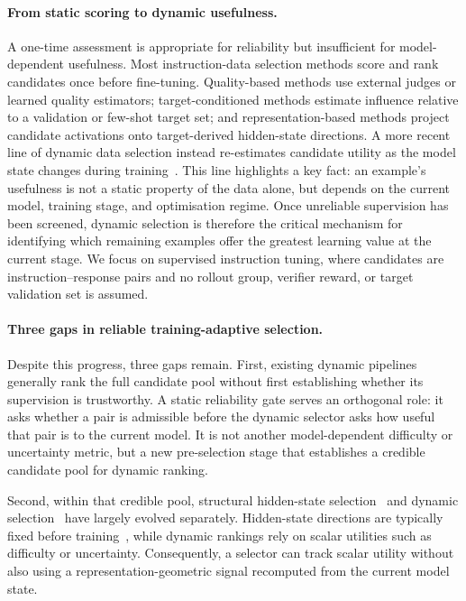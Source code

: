\paragraph{From static scoring to dynamic usefulness.}
A one-time assessment is appropriate for reliability but insufficient
for model-dependent usefulness. Most instruction-data selection
methods score and rank candidates once before fine-tuning.
Quality-based methods use external judges or learned quality
estimators; target-conditioned methods estimate influence relative
to a validation or few-shot target set; and representation-based
methods project candidate activations onto target-derived hidden-state
directions. A more recent line of dynamic data selection instead
re-estimates candidate utility as the model state changes during
training~\cite{kung2023activeit, sun2025dots}. This line highlights a
key fact: an example's usefulness is not a static property of the
data alone, but depends on the current model, training stage, and
optimisation regime. Once unreliable supervision has been screened,
dynamic selection is therefore the critical mechanism for identifying
which remaining examples offer the greatest learning value at the
current stage. We focus on supervised instruction tuning, where
candidates are instruction--response pairs and no rollout group,
verifier reward, or target validation set is assumed.

\paragraph{Three gaps in reliable training-adaptive selection.}
Despite this progress, three gaps remain. First, existing dynamic
pipelines generally rank the full candidate pool without first
establishing whether its supervision is trustworthy. A static
reliability gate serves an orthogonal role: it asks whether a pair is
admissible before the dynamic selector asks how useful that pair is
to the current model. It is not another model-dependent difficulty or
uncertainty metric, but a new pre-selection stage that establishes a
credible candidate pool for dynamic ranking.

Second, within that credible pool, structural hidden-state
selection~\cite{nait2026} and dynamic
selection~\cite{kung2023activeit, sun2025dots, dataagent}
have largely evolved separately. Hidden-state directions are
typically fixed before training~\cite{nait2026}, while dynamic
rankings rely on scalar utilities such as difficulty or uncertainty.
Consequently, a selector can track scalar utility without also using
a representation-geometric signal recomputed from the current model
state.

